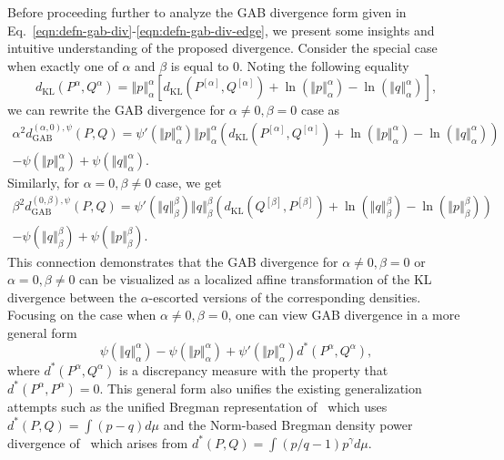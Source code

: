 \documentclass[11pt]{article}
\theoremstyle{plain}
\theoremstyle{remark}
\newcommand{\dKL}{d_{\mathrm{KL}}}
\newcommand{\dGAB}{d_{\mathrm{GAB}}}
\newcommand{\norm}[1]{\left\Vert #1 \right\Vert}
\begin{document}
Before proceeding further to analyze the GAB divergence form given in Eq.~\eqref{eqn:defn-gab-div}-\eqref{eqn:defn-gab-div-edge}, we present some insights and intuitive understanding of the proposed divergence. Consider the special case when exactly one of $\alpha$ and $\beta$ is equal to $0$. Noting the following equality
\begin{equation*}
    \dKL(P^\alpha, Q^\alpha) = \norm{p}_\alpha^\alpha \left[ \dKL(P^{[\alpha]}, Q^{[\alpha]}) + \ln(\norm{p}_\alpha^\alpha) - \ln(\norm{q}_\alpha^\alpha) \right],
\end{equation*}
\noindent we can rewrite the GAB divergence for $\alpha \neq 0, \beta = 0$ case as
\begin{multline}
    \alpha^2 \dGAB^{(\alpha,0),\psi}(P, Q)
    = \psi'(\norm{p}_\alpha^\alpha) \norm{p}_\alpha^\alpha \left( \dKL(P^{[\alpha]}, Q^{[\alpha]}) + \ln(\norm{p}_\alpha^\alpha) - \ln(\norm{q}_\alpha^\alpha) \right)\\
    - \psi(\norm{p}_\alpha^\alpha) + \psi(\norm{q}_\alpha^\alpha).
    \label{eqn:gab-to-kl-bzero}
\end{multline}
\noindent Similarly, for $\alpha = 0, \beta \neq 0$ case, we get
\begin{multline}
    \beta^2 \dGAB^{(0,\beta),\psi}(P, Q)
    = \psi'(\norm{q}_\beta^\beta) \norm{q}_\beta^\beta \left( \dKL(Q^{[\beta]}, P^{[\beta]}) + \ln(\norm{q}_\beta^\beta) - \ln(\norm{p}_\beta^\beta) \right)\\
    - \psi(\norm{q}_\beta^\beta) + \psi(\norm{p}_\beta^\beta).
    \label{eqn:gab-to-kl-azero}
\end{multline}
\noindent This connection demonstrates that the GAB divergence for $\alpha \neq 0, \beta = 0$ or $\alpha = 0, \beta \neq 0$ can be visualized as a localized affine transformation of the KL divergence between the $\alpha$-escorted versions of the corresponding densities. Focusing on the case when $\alpha \neq 0, \beta = 0$, one can view GAB divergence in a more general form
\begin{equation*}
    \psi(\norm{q}_{\alpha}^{\alpha}) - \psi(\norm{p}_{\alpha}^{\alpha}) + \psi'(\norm{p}_\alpha^\alpha) d^\ast(P^\alpha, Q^\alpha),
\end{equation*}
\noindent where $d^\ast(P^\alpha, Q^\alpha)$ is a discrepancy measure with the property that $d^\ast(P^\alpha, P^\alpha) = 0$. This general form also unifies the existing generalization attempts such as the unified Bregman representation of~\citep{roy2019density} which uses $d^\ast(P, Q) = \int (p - q)d\mu$ and the Norm-based Bregman density power divergence of~\citep{kobayashi2025unified} which arises from $d^\ast(P, Q) = \int (p/q - 1)p^\gamma d\mu$.
\end{document}
